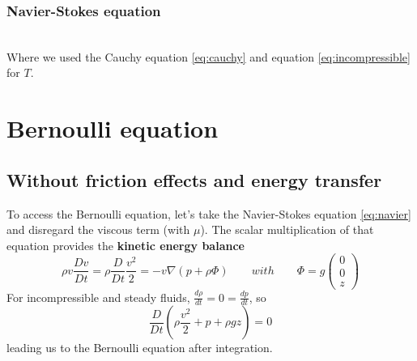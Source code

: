 		\subsubsection{Navier-Stokes equation}
		\ \\ Where we used the Cauchy equation \autoref{eq:cauchy} and equation \autoref{eq:incompressible} for $T$. 
		
\section{Bernoulli equation}
	\subsection{Without friction effects and energy transfer}
	To access the Bernoulli equation, let's take the Navier-Stokes equation \autoref{eq:navier} and disregard the viscous term (with $\mu$). The scalar multiplication of that equation provides the \textbf{kinetic energy balance}
	\begin{equation}
		\rho v \frac{Dv}{Dt} = \rho \frac{D}{Dt} \frac{v^2}{2} = -v\nabla (p + \rho \Phi) 
		\qquad with \qquad 
		\Phi = g
		\left(
		\begin{array}{c}
		0 \\
		0 \\
		z
		\end{array}
		\right)
	\end{equation}
	For incompressible and steady fluids, $\frac{d\rho}{dt} = 0 = \frac{dp}{dt}$, so 
	\begin{equation}
		\frac{D}{Dt}\left( \rho \frac{v^2}{2} + p + \rho g z \right)	 = 0 
	\end{equation}	 
		leading us to the Bernoulli equation after integration. \\
		
